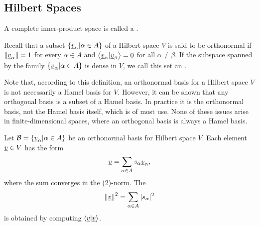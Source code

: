 \subsection{Hilbert Spaces}

\begin{definition}
A complete inner-product space is called a .
\end{definition}

\begin{definition}
Recall that a subset $\left\{ \underline{v}_{\alpha} | \alpha \in A \right\}$ of a Hilbert space $V$ is said to be orthonormal if $\left\| \underline{v}_{\alpha} \right\| = 1$ for every $\alpha \in A$ and $\left\langle \underline{v}_{\alpha} | \underline{v}_{\beta} \right\rangle = 0$ for all $\alpha \neq \beta$.
If the subspace spanned by the family $\left\{ \underline{v}_{\alpha} | \alpha \in A \right\}$ is dense in $V$, we call this set an .
\end{definition}

Note that, according to this definition, an orthonormal basis for a Hilbert space $V$ is not necessarily a Hamel basis for $V$.
However, it can be shown that any orthogonal basis is a subset of a Hamel basis.
In practice it is the orthonormal basis, not the Hamel basis itself, which is of most use.
None of these issues arise in finite-dimensional spaces, where an orthogonal basis is always a Hamel basis.

Let $\mathcal{B} = \left\{ \underline{v}_{\alpha} | \alpha \in A \right\}$ be an orthonormal basis for Hilbert space $V$.
Each element $\underline{v} \in V$ has the form
\begin{equation*}
\underline{v} = \sum_{\alpha \in A} s_{\alpha} \underline{v}_{\alpha},
\end{equation*}
where the sum converges in the (2)-norm.
The 
\begin{equation*}
\left\| \underline{v} \right\|^2 = \sum_{\alpha \in A} | s_{\alpha} |^2
\end{equation*}
is obtained by computing $\left\langle \underline{v} | \underline{v} \right\rangle$.

